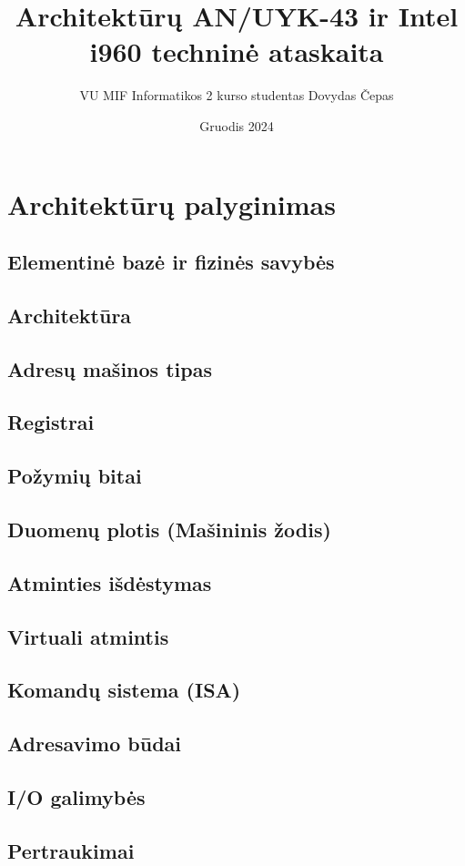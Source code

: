 \documentclass{article}
\title{Architektūrų AN/UYK-43 ir Intel i960 techninė ataskaita}
\author{VU MIF Informatikos 2 kurso studentas Dovydas Čepas}
\date{Gruodis 2024}
\begin{document}
\maketitle
\newpage
\section{Architektūrų palyginimas}
\subsection{Elementinė bazė ir fizinės savybės}
\subsection{Architektūra}
\subsection{Adresų mašinos tipas}
\subsection{Registrai}
\subsection{Požymių bitai}
\subsection{Duomenų plotis (Mašininis žodis)}
\subsection{Atminties išdėstymas}
\subsection{Virtuali atmintis}
\subsection{Komandų sistema (ISA)}
\subsection{Adresavimo būdai}
\subsection{I/O galimybės}
\subsection{Pertraukimai}
\end{document}
